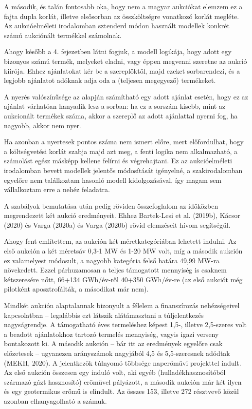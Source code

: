 \documentclass[twoside, magyar, showtrims]{corvinusphd}
\theoremstyle{plain}
\theoremstyle{remark}
\theoremstyle{definition}
\begin{document}
A második, és talán fontosabb oka, hogy nem a magyar aukciókat elemzem
ez a fajta dupla korlát, illetve elsősorban az összköltségre vonatkozó korlát megléte.
Az aukcióelméleti irodalomban sztenderd módon használt
modellek konkrét számú aukciónált termékkel számolnak.

Ahogy később a 4. fejezetben látni fogjuk,
a modell logikája, hogy adott egy bizonyos számú
termék, melyeket eladni, vagy éppen megvenni szeretne az aukció kiírója.
Ehhez ajánlatokat kér be a szereplőktől, majd ezeket sorbarendezi,
és a legjobb ajánlatot adóknak adja oda a (teljesen megegyező) termékeket.

A nyerés valószínűsége az alapján számítható egy adott ajánlat esetén,
hogy ez az ajánlat várhatóan hanyadik lesz a sorban: ha ez a sorszám kisebb,
mint az aukcionált termékek száma, akkor a szereplő az adott ajánlattal nyerni fog,
ha nagyobb, akkor nem nyer. 

Ha azonban a nyertesek pontos száma nem ismert előre, mert előfordulhat, hogy
a költségvetési korlát szabja majd azt meg, a fenti logika nem alkalmazható,
a számolást egész másképp kellene felírni és végrehajtani. 
Ez az aukcióelméleti irodalomban bevett modellek jelentős módosítását igényelné,
a szakirodalomban egyelőre nem találkoztam hasonló modell kidolgozásával,
így magam sem vállalkoztam erre a nehéz feladatra.

A szabályok bemutatása után pedig röviden összefoglalom
az időközben megrendezett két aukció eredményeit.
Ehhez Bartek-Lesi et al. (2019b), Kácsor (2020) és Varga (2020a) és Varga (2020b) 
rövid elemzéseit hívom segítségül.

Ahogy fent említettem, az aukción két méretkategóriában lehetett indulni.
Az első aukción a két méretsáv 0,3-1 MW és 1-20 MW volt,
míg a második aukción ez valamelyest módosult, a nagyobb kategória
felső határa 49,99 MW-ra növekedett. Ezzel párhuzamosan
a teljes támogatott mennyiség is csaknem kétszeresére nőtt, 
66+134 GWh/év-ről 40+350 GWh/év-re
(az első aukciót még pilotként aposztrofálták, a másodikat már nem).

Mindkét aukción alaptalannak bizonyult a félelem a finanszírozás
nehézségeivel kapcsolatban -- legalábbis ezt látszik alátámasztani 
a túljelentkezés nagyságrendje. A támogatható éves termeléshez
képest 1,5-, illetve 2,5-szeres volt a beadott ajánlatokhoz tartozó
termelés mennyiség, vagyis igazi verseny bontakozott ki.
A második aukción -- bár itt az eredmények egyelőre csak előzetesek --
ugyanezen arányszámok nagyjából 4,5 és 5,5-szeresnek adódtak (MEKH, 2020).
A jelentkezők túlnyomó többsége naperőművi projekttel
indult. Az első aukción összesen egy induló volt, aki egyéb
(hulladékhasznosítóból származó gázt hasznosító) erőművel
pályázott, a második aukción már két ilyen és egy geotermikus
erőmű is elindult. Az összes 153, illetve 272 résztvevő közül azonban
elhanyagolható a számuk. 
\end{document}
